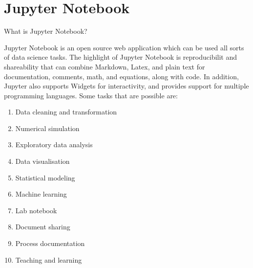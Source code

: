 \documentclass[aspectratio=169,xcolor=dvipsnames,svgnames,x11names,fleqn]{beamer}
\begin{document}
\section{Jupyter Notebook}

\begin{frame}
    \sectionpage
\end{frame}


\begin{frame}[containsverbatim]{What is Jupyter Notebook?}
    
    \footnotesize

    Jupyter Notebook is an open source web application which can be used all sorts of data science tasks. The highlight of Jupyter Notebook is reproducibilit and shareability that can combine Markdown, Latex, and plain text for documentation, comments, math, and equations, along with code. In addition, Jupyter also supports Widgets for interactivity, and provides support for multiple programming languages. Some tasks that are possible are:

    \begin{enumerate}
        \item Data cleaning and transformation
        \item Numerical simulation
        \item Exploratory data analysis
        \item Data visualisation
        \item Statistical modeling
        \item Machine learning
        \item Lab notebook
        \item Document sharing
        \item Process documentation
        \item Teaching and learning
    \end{enumerate}

\end{frame}
\end{document}
